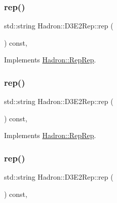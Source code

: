 \subsubsection{\texorpdfstring{rep()}{rep()}\hspace{0.1cm}{\footnotesize\ttfamily [3/5]}}
{\footnotesize\ttfamily std\+::string Hadron\+::\+D3\+E2\+Rep\+::rep (\begin{DoxyParamCaption}{ }\end{DoxyParamCaption}) const\hspace{0.3cm}{\ttfamily [inline]}, {\ttfamily [virtual]}}



Implements \mbox{\hyperlink{structHadron_1_1RepRep_ab3213025f6de249f7095892109575fde}{Hadron\+::\+Rep\+Rep}}.

\mbox{\label{structHadron_1_1D3E2Rep_a364e5dfff2bff7d5c2cfce7811e2fe9f}} 
\subsubsection{\texorpdfstring{rep()}{rep()}\hspace{0.1cm}{\footnotesize\ttfamily [4/5]}}
{\footnotesize\ttfamily std\+::string Hadron\+::\+D3\+E2\+Rep\+::rep (\begin{DoxyParamCaption}{ }\end{DoxyParamCaption}) const\hspace{0.3cm}{\ttfamily [inline]}, {\ttfamily [virtual]}}



Implements \mbox{\hyperlink{structHadron_1_1RepRep_ab3213025f6de249f7095892109575fde}{Hadron\+::\+Rep\+Rep}}.

\mbox{\label{structHadron_1_1D3E2Rep_a364e5dfff2bff7d5c2cfce7811e2fe9f}} 
\subsubsection{\texorpdfstring{rep()}{rep()}\hspace{0.1cm}{\footnotesize\ttfamily [5/5]}}
{\footnotesize\ttfamily std\+::string Hadron\+::\+D3\+E2\+Rep\+::rep (\begin{DoxyParamCaption}{ }\end{DoxyParamCaption}) const\hspace{0.3cm}{\ttfamily [inline]}, {\ttfamily [virtual]}}



